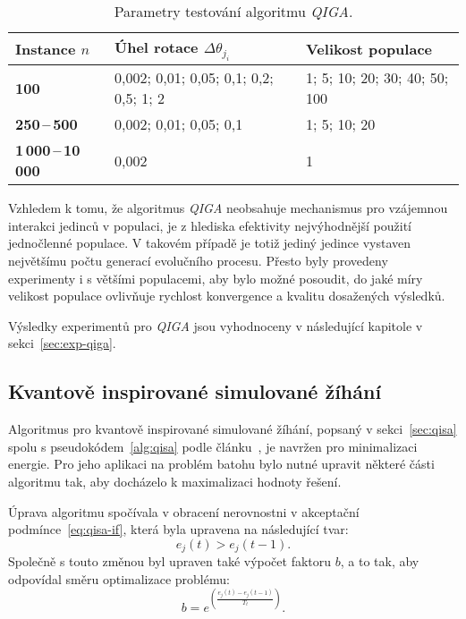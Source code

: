 \begin{table}[ht]
  \centering
  \begin{tabularx}{\linewidth}{l X X }
    \toprule
    \textbf{Instance $n$} & \textbf{Úhel rotace $\Delta\theta_{j_i}$} & \textbf{Velikost populace} \\
    \midrule
    \textbf{100}  
      & 0,002; 0,01; 0,05; 0,1; 0,2; 0,5; 1; 2
      & 1; 5; 10; 20; 30; 40; 50; 100 \\[1ex]
    \textbf{250\,--\,500}  
      & 0,002; 0,01; 0,05; 0,1
      & 1; 5; 10; 20 \\[1ex]
    \textbf{1\,000\,--\,10\,000} 
      & 0,002
      & 1 \\
    \bottomrule
  \end{tabularx}
  \caption{Parametry testování algoritmu \emph{QIGA}.}
  \label{tab:qiga-all-instance}
\end{table}


Vzhledem k tomu, že algoritmus \emph{QIGA} neobsahuje mechanismus pro vzájemnou interakci jedinců v populaci, je z hlediska efektivity nejvýhodnější použití jednočlenné populace.
V takovém případě je totiž jediný jedince vystaven největšímu počtu generací evolučního procesu. 
Přesto byly provedeny experimenty i s většími populacemi, aby bylo možné posoudit, do jaké míry velikost populace ovlivňuje rychlost konvergence a kvalitu dosažených výsledků. 

Výsledky experimentů pro \emph{QIGA} jsou vyhodnoceny v následující kapitole v sekci~\ref{sec:exp-qiga}.

\subsection*{Kvantově inspirované simulované žíhání}
Algoritmus pro kvantově inspirované simulované žíhání, popsaný v sekci~\ref{sec:qisa} spolu s pseudokódem~\ref{alg:qisa} podle článku~\cite{qisa}, je navržen pro minimalizaci energie. 
Pro jeho aplikaci na problém batohu bylo nutné upravit některé části algoritmu tak, aby docházelo k maximalizaci hodnoty řešení.

Úprava algoritmu spočívala v obracení nerovnostni v akceptační podmínce~\ref{eq:qisa-if}, která byla upravena na následující tvar:
\begin{equation*}
    e_j\left(t\right) > e_j\left(t-1\right).
\end{equation*}
Společně s touto změnou byl upraven také výpočet faktoru $b$, a to tak, aby odpovídal směru optimalizace problému:
\begin{equation*}
    b = e^{\left(\frac{e_j\left(t\right) - e_j\left(t-1\right)}{T_t}\right)}.
\end{equation*}

